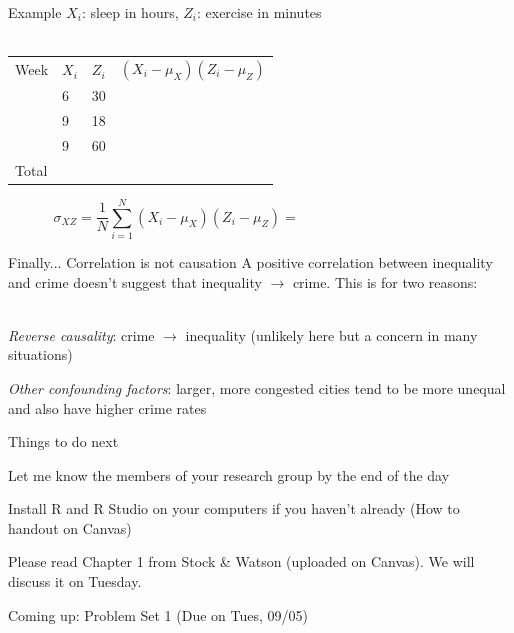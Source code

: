 \documentclass{./../div_teaching_slides}
\begin{document}
\begin{frame}{Example}
\vspace{-0.25em}
$X_i$: sleep in hours, $Z_i$: exercise in minutes \\~\\
\begin{tabularx}{1\textwidth}{P{1.5cm}P{1.5cm}P{1.5cm}Y}
\hline \addlinespace[0.5em]
Week & $X_i$ & $Z_i$ & $(X_i-\mu_X)(Z_i-\mu_Z)$   \\ \addlinespace[0.5em] \hline {} & 6 & 30 &    \\ \hline {} & 9 & 18 &    \\ \hline {} & 9 & 60 &    \\ \hline \addlinespace[0.5em]
 Total & & & \\
 \hline 
\end{tabularx} 
$$ \sigma_{XZ} = \frac{1}{N}\sum_{i=1}^N (X_i-\mu_X)(Z_i-\mu_Z) = \hspace{5cm} $$
\end{frame}


\begin{frame}{Finally... Correlation is not causation}
A positive correlation between inequality and crime doesn't suggest that inequality $\rightarrow$ crime. This is for two reasons: \\~\\
\begin{witemize}
  \item \textit{Reverse causality}: crime $\rightarrow$ inequality (unlikely here but a concern in many situations)
  \item \textit{Other confounding factors}: larger, more congested cities tend to be more unequal and also have higher crime rates
\end{witemize}
\end{frame}


\begin{frame}{Things to do next}
\begin{witemize}
\item Let me know the members of your research group by the end of the day
\item Install R and R Studio on your computers if you haven't already (How to handout on Canvas)
\item Please read Chapter 1 from Stock \& Watson (uploaded on Canvas). We will discuss it on Tuesday. 
\item Coming up: Problem Set 1 (Due on Tues, 09/05)
\end{witemize}
\end{frame}
\end{document}
